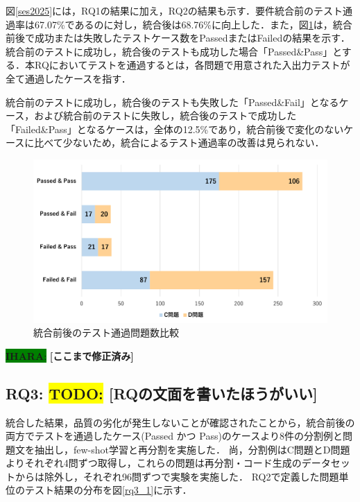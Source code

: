 \documentclass[submit,techrep,noauthor]{ipsj}
\newcommand{\todo}[1]{\colorbox{yellow}{{\bf TODO}:}{\color{red} {\textbf{[#1]}}}}
\newcommand{\ihara}[1]{\colorbox{green}{{\bf IHARA}:}{\color{blue} {\textbf{[#1]}}}}
\begin{document}
図\ref{ses2025}には，RQ1の結果に加え，RQ2の結果も示す．要件統合前のテスト通過率は67.07\%であるのに対し，統合後は68.76\%に向上した．また，図\ref{rq2_1}は，統合前後で成功または失敗したテストケース数をPassedまたはFailedの結果を示す．統合前のテストに成功し，統合後のテストも成功した場合「Passed\&Pass」とする．本RQにおいてテストを通過するとは，各問題で用意された入出力テストが全て通過したケースを指す．

統合前のテストに成功し，統合後のテストも失敗した「Passed\&Fail」となるケース，および統合前のテストに失敗し，統合後のテストで成功した「Failed\&Pass」となるケースは，全体の12.5\%であり，統合前後で変化のないケースに比べて少ないため，統合によるテスト通過率の改善は見られない．



\begin{figure}[t]
    \centering
    \includegraphics[width=1.0\linewidth]{./Toyoshima_fig/SIGSE_PF.pdf}
    \caption{統合前後のテスト通過問題数比較}
    \label{rq2_1}
\end{figure}

\ihara{ここまで修正済み}

\subsection{RQ3:  \todo{RQの文面を書いたほうがいい}}
統合した結果，品質の劣化が発生しないことが確認されたことから，統合前後の両方でテストを通過したケース(Passed かつ Pass)のケースより8件の分割例と問題文を抽出し，few-shot学習と再分割を実施した．
尚，分割例はC問題とD問題よりそれぞれ4問ずつ取得し，これらの問題は再分割・コード生成のデータセットからは除外し，それぞれ96問ずつで実験を実施した．
RQ2で定義した問題単位のテスト結果の分布を図\ref{rq3_1}に示す．
\end{document}
